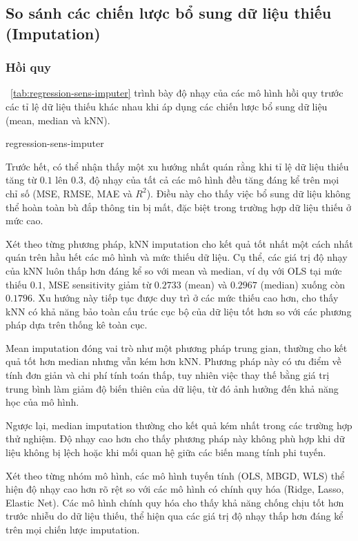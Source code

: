 \subsection{So sánh các chiến lược bổ sung dữ liệu thiếu (Imputation)}

\subsubsection{Hồi quy}

\tablename~\ref{tab:regression-sens-imputer} trình bày độ nhạy của các mô hình
hồi quy trước các tỉ lệ dữ liệu thiếu khác nhau khi áp dụng các chiến lược bổ
sung dữ liệu (mean, median và kNN).

{regression-sens-imputer}

Trước hết, có thể nhận thấy một xu hướng nhất quán rằng khi tỉ lệ dữ liệu thiếu
tăng từ $0.1$ lên $0.3$, độ nhạy của tất cả các mô hình đều tăng đáng kể trên
mọi chỉ số (MSE, RMSE, MAE và $R^2$). Điều này cho thấy việc bổ sung dữ liệu
không thể hoàn toàn bù đắp thông tin bị mất, đặc biệt trong trường hợp dữ liệu
thiếu ở mức cao.

Xét theo từng phương pháp, kNN imputation cho kết quả tốt nhất một cách nhất
quán trên hầu hết các mô hình và mức thiếu dữ liệu. Cụ thể, các giá trị độ nhạy
của kNN luôn thấp hơn đáng kể so với mean và median, ví dụ với OLS tại mức
thiếu $0.1$, MSE sensitivity giảm từ $0.2733$ (mean) và $0.2967$ (median) xuống
còn $0.1796$. Xu hướng này tiếp tục được duy trì ở các mức thiếu cao hơn, cho
thấy kNN có khả năng bảo toàn cấu trúc cục bộ của dữ liệu tốt hơn so với các
phương pháp dựa trên thống kê toàn cục.

Mean imputation đóng vai trò như một phương pháp trung gian, thường cho kết quả
tốt hơn median nhưng vẫn kém hơn kNN. Phương pháp này có ưu điểm về tính đơn
giản và chi phí tính toán thấp, tuy nhiên việc thay thế bằng giá trị trung bình
làm giảm độ biến thiên của dữ liệu, từ đó ảnh hưởng đến khả năng học của mô
hình.

Ngược lại, median imputation thường cho kết quả kém nhất trong các trường hợp
thử nghiệm. Độ nhạy cao hơn cho thấy phương pháp này không phù hợp khi dữ liệu
không bị lệch hoặc khi mối quan hệ giữa các biến mang tính phi tuyến.

Xét theo từng nhóm mô hình, các mô hình tuyến tính (OLS, MBGD, WLS) thể hiện độ
nhạy cao hơn rõ rệt so với các mô hình có chính quy hóa (Ridge, Lasso, Elastic
Net).  Các mô hình chính quy hóa cho thấy khả năng chống chịu tốt hơn trước
nhiễu do dữ liệu thiếu, thể hiện qua các giá trị độ nhạy thấp hơn đáng kể trên
mọi chiến lược imputation.


